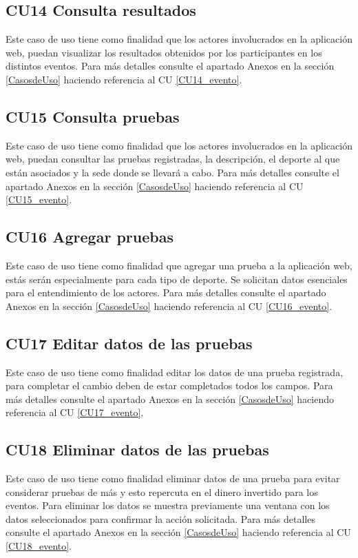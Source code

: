 		\subsection{CU14 Consulta resultados}
		\noindent Este caso de uso tiene como finalidad que los actores involucrados en la aplicación web, puedan visualizar los resultados obtenidos por los participantes en los distintos eventos. Para más detalles consulte el apartado Anexos en la sección \ref{CasosdeUso} haciendo referencia al CU \ref{CU14_evento}.\\
		
		\subsection{CU15 Consulta pruebas}
		\noindent Este caso de uso tiene como finalidad que los actores involucrados en la aplicación web, puedan consultar las pruebas registradas, la descripción, el deporte al que están asociados y la sede donde se llevará a cabo. Para más detalles consulte el apartado Anexos en la sección \ref{CasosdeUso} haciendo referencia al CU \ref{CU15_evento}.\\
		
		\subsection{CU16 Agregar pruebas}
		\noindent Este caso de uso tiene como finalidad que agregar una prueba a la aplicación web, estás serán especialmente para cada tipo de deporte. Se solicitan datos esenciales para el entendimiento de los actores. Para más detalles consulte el apartado Anexos en la sección \ref{CasosdeUso} haciendo referencia al CU \ref{CU16_evento}.
		\\
		
		\subsection{CU17 Editar datos de las pruebas}
		\noindent Este caso de uso tiene como finalidad editar los datos de una prueba registrada, para completar el cambio deben de estar completados todos los campos. Para más detalles consulte el apartado Anexos en la sección \ref{CasosdeUso} haciendo referencia al CU \ref{CU17_evento}.\\
		
		\subsection{CU18 Eliminar datos de las pruebas}
		\noindent Este caso de uso tiene como finalidad eliminar datos de una prueba para evitar considerar pruebas de más y esto repercuta en el dinero invertido para los eventos. Para eliminar los datos se muestra previamente una ventana con los datos seleccionados para confirmar la acción solicitada. Para más detalles consulte el apartado Anexos en la sección \ref{CasosdeUso} haciendo referencia al CU \ref{CU18_evento}.\\
		
